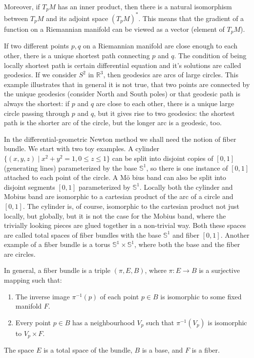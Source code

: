 Moreover, if $T_pM$ has an inner product, then there is a natural isomorphism
between $T_pM$ and its adjoint space $(T_pM)^*$. This means that the 
gradient of a function on a Riemannian manifold can be viewed as a vector (element
of $T_pM$).


If two different points $p, q$ on a Riemannian manifold are close enough to each other,
there is a unique shortest path connecting $p$ and $q$. 
The condition of being locally shortest path is certain differential equation
and it's solutions are called geodesics. If we consider $S^2$ in $\mathbb{R}^3$, 
then geodesics are arcs of large circles. This example illustrates that in general it is not true,
that two points are connected by the unique geodesics (consider North and South poles)
or that geodesic path is always the shortest: if $p$ and $q$ are close to each other,
there is a unique large circle passing through $p$ and $q$, but it gives rise to two
geodesics: the shortest path is the shorter arc of the circle, but the longer arc 
is a geodesic, too.


In the differential-geometric Newton method
we shall need the notion of fiber bundle.
We start with two toy examples.
A cylinder $ \{ (x, y, z) \mid x^2 + y^2 = 1, 0 \leq z \leq 1 \}$
can be split into disjoint copies of $[0,1]$ (generating lines)
parameterized by the base $\mathbb{S}^1$,
so there is one instance of $[0,1]$ attached to each point of the circle.
A M\"o bius band can also be split into disjoint segments
$[0,1]$ parameterized by $\mathbb{S}^1$. Locally both the cylinder
and Mobius band are isomorphic to a cartesian product
of the arc of a circle and $[0,1]$. The cylinder is, of course,
isomorphic to the cartesian product not just locally, but globally,
but it is not the case for the Mobius band, where the trivially
looking pieces are glued together in a non-trivial way. Both these spaces
are called total spaces of fiber bundles with the base $\mathbb{S}^1$ and fiber $[0,1]$.
Another example of a fiber bundle is a torus $\mathbb{S^1} \times \mathbb{S}^1$,
where both the base and the fiber are circles. 

In general, a fiber bundle is a triple $( \pi, E, B)$, where
$ \pi \colon E \to B$ is a surjective mapping such that:
\begin{enumerate}
    \item The inverse image $\pi^{-1}(p)$ of each point $p \in B$ is 
    isomorphic to some fixed manifold $F$.
    \item Every point $p \in B$ has a neighbourhood $V_p$
    such that $\pi^{-1}(V_p)$ is isomorphic to $V_p \times F$.
\end{enumerate}
    The space $E$ is a total space of the bundle, $B$ is a base, and $F$ is a fiber.

